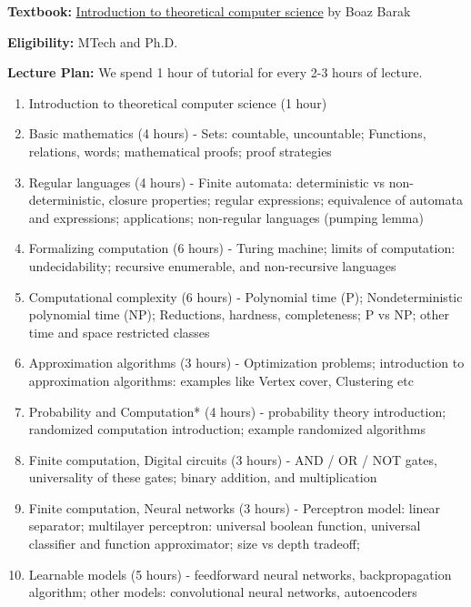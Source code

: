 \documentclass[12pt, a4paper]{letter} %
\begin{document}
\textbf{Textbook:} \href{https://files.boazbarak.org/introtcs/lnotes_book.pdf}{Introduction to theoretical computer science} by Boaz Barak

\textbf{Eligibility:} MTech and Ph.D.



\noindent
\textbf{Lecture Plan:}
We spend 1 hour of tutorial for every 2-3 hours of lecture.
\begin{enumerate}
 \item Introduction to theoretical computer science (1 hour)
 \item Basic mathematics (4 hours) - Sets: countable, uncountable; Functions, relations, words; mathematical proofs; proof strategies
 \item Regular languages (4 hours) - Finite automata: deterministic vs non-deterministic, closure properties; regular expressions; equivalence of automata and expressions; applications; non-regular languages (pumping lemma)
 \item Formalizing computation (6 hours) - Turing machine; limits of computation: undecidability; recursive enumerable, and non-recursive languages
 \item Computational complexity (6 hours) - Polynomial time (P); Nondeterministic polynomial time (NP); Reductions, hardness, completeness; P vs NP; other time and space restricted classes
 \item Approximation algorithms (3 hours) - Optimization problems; introduction to approximation algorithms: examples like Vertex cover, Clustering etc
 \item Probability and Computation* (4 hours) - probability theory introduction; randomized computation introduction; example randomized algorithms
 \item Finite computation, Digital circuits (3 hours) - AND / OR / NOT gates, universality of these gates; binary addition, and multiplication
 \item Finite computation, Neural networks (3 hours) - Perceptron model: linear separator; multilayer perceptron: universal boolean function, universal classifier and function approximator; size vs depth tradeoff;
 \item Learnable models (5 hours) - feedforward neural networks, backpropagation algorithm; other models: convolutional neural networks, autoencoders
\end{enumerate}
\end{document}
